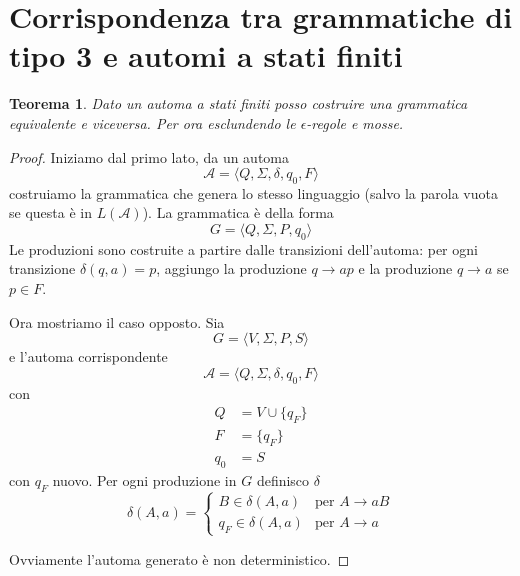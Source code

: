 \documentclass[12pt]{article}
\newtheorem{teorema}{Teorema}
\begin{document}
\tableofcontents
\newpage

\section{Corrispondenza tra grammatiche di tipo 3 e automi a stati finiti}
\begin{teorema} 
	Dato un automa a stati finiti posso costruire una grammatica equivalente e viceversa.
	Per ora esclundendo le $\epsilon$-regole e mosse.
\end{teorema}
\begin{proof}
	Iniziamo dal primo lato, da un automa 
	$$ \mathcal{A} = \langle Q, \Sigma, \delta, q_0, F \rangle $$
	costruiamo la grammatica che genera lo stesso linguaggio (salvo la parola vuota se questa è in $L(\mathcal{A})$).
	La grammatica è della forma
	$$ G = \langle Q, \Sigma, P, q_0 \rangle $$
	Le produzioni sono costruite a partire dalle transizioni dell'automa: per ogni transizione $\delta(q, a) = p$, aggiungo la produzione $q \rightarrow a p$ e la produzione $q \rightarrow a$ se $p \in F$.

	Ora mostriamo il caso opposto.
	Sia
	$$ G = \langle V, \Sigma, P, S \rangle $$
	e l'automa corrispondente
	$$ \mathcal{A} = \langle Q, \Sigma, \delta, q_0, F \rangle $$
	con 
	\begin{align*}
		Q &= V \cup \{q_F\} \\
		F &= \{ q_F \} \\
		q_0 &= S 
	\end{align*}
	con $q_F$ nuovo.
	Per ogni produzione in $G$ definisco $\delta$
	$$
	\delta(A, a) = 
	\begin{cases}
		B \in \delta(A, a) & \text{per } A \rightarrow a B \\
		q_F \in \delta(A, a) & \text{per } A \rightarrow a
	\end{cases}
	$$

	Ovviamente l'automa generato è non deterministico.
\end{proof}
\end{document}
